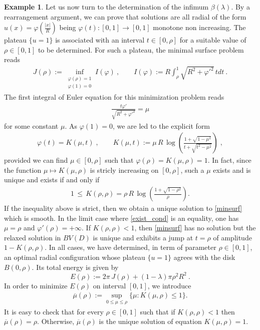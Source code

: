 \documentclass[reqno,11pt]{amsart}
\theoremstyle{definition}
\newtheorem{example}[theorem]{Example}
\numberwithin{equation}{section}
\def\ov{\overline}
\newcommand{\1}{{{\bf 1}\kern-0,28em\rm l}}
\newcommand{\f}{\varphi}
\begin{document}
\begin{example}
Let us now turn to the determination of the infimum $\beta(\lambda)$. 
By a rearrangement argument, we can prove that solutions are all radial of the form $u(x) = \f(\frac{|x|}{R})$ being $\f(t):[0,1]\to [0,1]$ monotone non increasing.
The plateau $\{u=1\}$ is associated with an interval $t\in [0, \rho]$ for a suitable value of $\rho\in [0, 1]$ to be determined. 
For such a plateau, the minimal surface problem reads
\begin{align}\label{minsurf}
 J(\rho) :=\inf_{\substack{\f(\rho) = 1\\ \f(1) = 0}} I(\f)  \ ,\qquad I(\f) := R \int_\rho^1 \sqrt{R^2+\f'^2} \, tdt \ . 
\end{align}
The first integral of Euler equation for this minimization problem reads
\begin{align}
\frac{t\f'}{\sqrt{R^2 + \f'^2}} = \mu \label{int1Euler}
\end{align}
for some constant $\mu$. As $\f(1) = 0$, we are led to the explicit form 
\begin{align}
\f (t) = K(\mu,t)  \;,\qquad K(\mu,t) := \mu \, R \, \log \left( \frac{1 + \sqrt{1 - \mu^2}}{t + \sqrt{t^2 - \mu^2}} \right)\;,\label{sol_phi}
\end{align}
provided we can find $\mu \in [0,\rho]$ such that $\f(\rho)=K(\mu,\rho)=1$.
In fact, since the function $\mu \mapsto K(\mu,\rho)$ is stricly increasing on $[0, \rho]$,   such a $\mu$ exists and is unique and exists if and only if
\begin{align}
1 \,\le\,  K(\rho,\rho)= \rho\, R\, \log\left(\frac{1 + \sqrt{1 - \rho^2}}{\rho}\right). 
\label{exist_cond} 
\end{align}
If the inequality above is strict, then we obtain a unique  solution to \eqref{minsurf} which is smooth.  
In the limit case where \eqref{exist_cond} is an equality, one has $\mu=\rho$ and  $\f'(\rho)=+\infty$.
If $K(\rho,\rho)<1$, then  \eqref{minsurf} has no solution but the  relaxed solution in $BV(D)$ is unique and exhibits a jump at $t=\rho$
of amplitude $1- K(\rho,\rho)$.
In all cases, we have determined, in term of parameter  $\rho\in [0,1]$, an optimal radial configuration whose plateau $\{u=1\}$
agrees with the disk $B(0,\rho)$. Its total energy is given by
$$ E (\rho) :=  2\pi \, J(\rho) + (1-\lambda) \pi \rho^2 R^2 \ .$$
In order  to minimize $E(\rho)$ on interval $[0,1]$, we introduce 
\begin{align*}
\ov\mu(\rho):= \sup_{0\le \mu \le \rho} \{\mu : K(\mu,\rho) \le 1\}.
\end{align*}
It is easy to check that for every $\rho\in[0,1]$ such that if $K(\rho,\rho)< 1$ then $\ov\mu(\rho) =\rho$. Otherwise, $\ov\mu(\rho)$ is the unique solution of equation $K(\mu,\rho)=1$.

\end{example}
\end{document}
